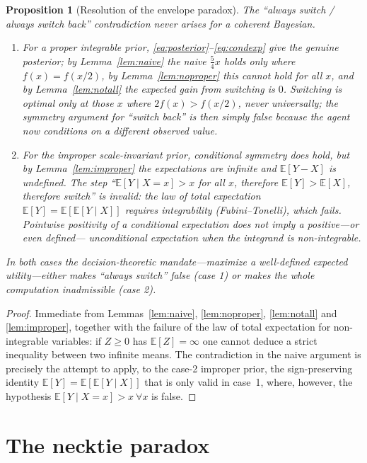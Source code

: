 \documentclass{amsart}
\theoremstyle{plain}
\newtheorem{proposition}{Proposition}
\theoremstyle{definition}
\begin{document}
\begin{proposition}[Resolution of the envelope paradox]\label{prop:env}
The ``always switch / always switch back'' contradiction never arises for a
coherent Bayesian.
\begin{enumerate}
\item For a \emph{proper} integrable prior, \eqref{eq:posterior}--\eqref{eq:condexp}
give the genuine posterior; by Lemma~\ref{lem:naive} the naive $\tfrac54x$ holds
only where $f(x)=f(x/2)$, by Lemma~\ref{lem:noproper} this cannot hold for all
$x$, and by Lemma~\ref{lem:notall} the expected gain from switching is $0$.
Switching is optimal only at those $x$ where $2f(x)>f(x/2)$, never universally;
the symmetry argument for ``switch back'' is then simply false because the agent
now conditions on a different observed value.
\item For the \emph{improper} scale-invariant prior, conditional symmetry does
hold, but by Lemma~\ref{lem:improper} the expectations are infinite and
$\mathbb E[Y-X]$ is undefined. The step ``$\mathbb E[Y\mid X=x]>x$ for all $x$,
therefore $\mathbb E[Y]>\mathbb E[X]$, therefore switch'' is invalid: the law of
total expectation $\mathbb E[Y]=\mathbb E[\mathbb E[Y\mid X]]$ requires
integrability (Fubini--Tonelli), which fails. Pointwise positivity of a
conditional expectation does \emph{not} imply a positive---or even defined---
unconditional expectation when the integrand is non-integrable.
\end{enumerate}
In both cases the decision-theoretic mandate---maximize a well-defined expected
utility---either makes ``always switch'' false (case 1) or makes the whole
computation inadmissible (case 2).
\end{proposition}

\begin{proof}
Immediate from Lemmas~\ref{lem:naive}, \ref{lem:noproper}, \ref{lem:notall} and
\ref{lem:improper}, together with the failure of the law of total expectation
for non-integrable variables: if $Z\ge 0$ has $\mathbb E[Z]=\infty$ one cannot
deduce a strict inequality between two infinite means. The contradiction in the
naive argument is precisely the attempt to apply, to the case-2 improper prior,
the sign-preserving identity $\mathbb E[Y]=\mathbb E[\mathbb E[Y\mid X]]$
that is only valid in case~1, where, however, the hypothesis
$\mathbb E[Y\mid X=x]>x\ \forall x$ is false.
\end{proof}

\section{The necktie paradox}
\end{document}
